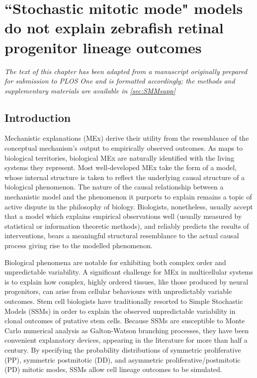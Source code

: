 \chapter{``Stochastic mitotic mode" models do not explain zebrafish retinal progenitor lineage outcomes}
\label{chap:SMME}
\textit{The text of this chapter has been adapted from a manuscript originally prepared for submission to PLOS One and is formatted accordingly; the methods and supplementary materials are available in \autoref{sec:SMMsupp}}

\section{Introduction}

Mechanistic explanations (MEx) derive their utility from the resemblance of the conceptual mechanism's output to empirically observed outcomes. As maps to biological territories, biological MEx are naturally identified with the living systems they represent. Most well-developed MEx take the form of a model, whose internal structure is taken to reflect the underlying causal structure of a biological phenomenon. The nature of the causal relationship between a mechanistic model and the phenomenon it purports to explain remains a topic of active dispute in the philosophy of biology\cite{Fagan2015}. Biologists, nonetheless, usually accept that a model which explains empirical observations well (usually measured by statistical or information theoretic methods), and reliably predicts the results of interventions, bears a meaningful structural resemblance to the actual causal process giving rise to the modelled phenomenon.

Biological phenomena are notable for exhibiting both complex order and unpredictable variability. A significant challenge for MEx in multicellular systems is to explain how complex, highly ordered tissues, like those produced by neural progenitors, can arise from cellular behaviours with unpredictably variable outcomes. Stem cell biologists have traditionally resorted to Simple Stochastic Models (SSMs) in order to explain the observed unpredictable variability in clonal outcomes of putative stem cells\cite{Till1964,Fagan2013}. Because SSMs are susceptible to Monte Carlo numerical analysis as Galton-Watson branching processes, they have been convenient explanatory devices, appearing in the literature for more than half a century. By specifying the probability distributions of symmetric proliferative (PP), symmetric postmitotic (DD), and asymmetric proliferative/postmitotic (PD) mitotic modes, SSMs allow cell lineage outcomes to be simulated.

